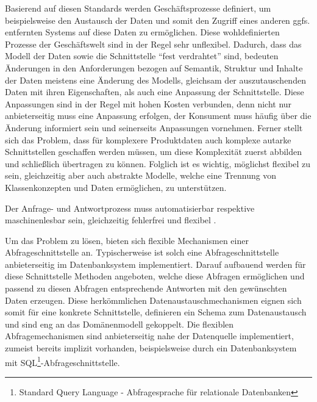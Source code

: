 Basierend auf diesen Standards werden Geschäftsprozesse definiert, um beispielsweise den Austausch der Daten und somit den Zugriff eines anderen ggfs. entfernten Systems auf diese Daten zu ermöglichen. Diese wohldefinierten Prozesse  der Geschäftswelt sind in der Regel sehr unflexibel. Dadurch, dass das Modell der Daten sowie die Schnittstelle \enquote{fest verdrahtet} sind, bedeuten Änderungen in den Anforderungen bezogen auf Semantik, Struktur und Inhalte der Daten meistens eine Änderung des Modells, gleichsam der auszutauschenden Daten mit ihren Eigenschaften, als auch eine Anpassung der Schnittstelle. Diese Anpassungen sind in der Regel mit hohen Kosten verbunden, denn nicht nur anbieterseitig muss eine Anpassung erfolgen, der Konsument muss häufig über die Änderung informiert sein und seinerseits Anpassungen vornehmen. 
Ferner stellt sich das Problem, dass für komplexere Produktdaten auch komplexe autarke Schnittstellen geschaffen werden müssen, um diese Komplexität zuerst abbilden und schließlich übertragen zu können.  
Folglich ist es wichtig, möglichst flexibel zu sein, gleichzeitig aber auch abstrakte Modelle, welche eine Trennung von Klassenkonzepten und Daten ermöglichen, zu unterstützen. 

Der Anfrage- und Antwortprozess muss automatisierbar respektive maschinenlesbar sein, gleichzeitig fehlerfrei und flexibel \citep[vgl.][]{uiterwykEclass}.


Um das Problem zu lösen, bieten sich flexible Mechanismen einer \gls{Abfrageschnittstelle} an. Typischerweise ist solch eine \gls{Abfrageschnittstelle} anbieterseitig im Datenbanksystem implementiert. Darauf aufbauend werden für diese Schnittstelle Methoden angeboten, welche diese Abfragen ermöglichen und passend zu diesen Abfragen entsprechende Antworten mit den gewünschten Daten erzeugen. 
Diese herkömmlichen Datenaustauschmechanismen eignen sich somit für eine konkrete Schnittstelle, definieren ein Schema zum Datenaustausch und sind eng an das Domänenmodell gekoppelt. Die flexiblen Abfragemechanismen sind anbieterseitig nahe der Datenquelle implementiert, zumeist bereits implizit vorhanden, beispielsweise durch ein Datenbanksystem mit SQL\footnote{Standard Query Language - Abfragesprache für relationale Datenbanken}-Abfrageschnittstelle. 

